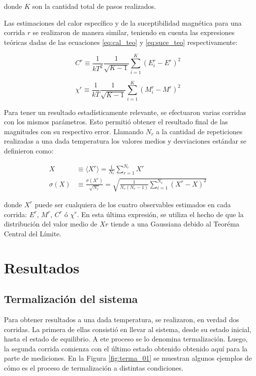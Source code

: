 \documentclass[a4paper,12pt]{article}
\begin{document}
\noindent donde $K$ son la cantidad total de pasos realizados.

Las estimaciones del calor específico y de la suceptibilidad magnética para una 
corrida $r$ se realizaron de manera similar, teniendo en cuenta las expresiones 
teóricas dadas de las ecuaciones \eqref{eq:cal_teo} y \eqref{eq:suce_teo} 
respectivamente:

\begin{equation}
 C^r \equiv  \frac{1}{kT^2} \frac{1}{\sqrt{K-1}} \sum_{i=1}^K \left(
 E_i^r - E^r \right)^2
\end{equation}

\begin{equation}
 \chi^r \equiv  \frac{1}{kT} \frac{1}{\sqrt{K-1}} \sum_{i=1}^K \left(
 M_i^r -  M^r \right)^2
\end{equation}

Para tener un resultado estadísticamente relevante, se efectuaron varias 
corridas con los mismos parámetros. Esto permitió obtener el resultado final de 
las magnitudes con su respectivo error. Llamando $N_r$ a la cantidad de 
repeticiones realizadas a una dada temperatura los valores medios y 
desviaciones estándar se definieron como:

\begin{subequations}
\begin{align}
X & \equiv \langle X^r \rangle = \frac{1}{N_r} 
\sum_{r=1}^{N_r} X^r \\
\sigma(X) & \equiv \frac{\sigma(X^r)}{\sqrt{N_r}} =  \sqrt{\frac{1}{N_r(N_r-1)} 
\sum_{i=1}^{N_r} \left( 
 X^r -  X \right)^2}
\end{align}
\end{subequations}

\noindent donde $X^r$ puede ser cualquiera de los cuatro observables estimados 
en cada corrida: $E^r$, $M^r$, $C^r$ ó $\chi^r$. En esta última expresión, se 
utiliza el hecho de que la distribución del valor medio de $Xr$ tiende a una 
Gaussiana debido al Teoréma Central del Límite.

\section{Resultados}

\subsection{Termalización del sistema}

Para obtener resultados a una dada temperatura, se realizaron, en verdad dos 
corridas. La primera de ellas consistió en llevar al sistema, desde su estado 
inicial, hasta el estado de equilibrio. A ete proceso se lo denomina 
termalización. Luego, la segunda corrida comienza con el último estado obtenido 
obtenido aquí para la parte de mediciones. En la Figura \ref{fig:terma_01} se 
muestran algunos ejemplos de cómo es el proceso de termalización a distintas 
condiciones.
\end{document}
